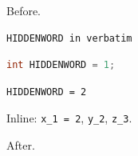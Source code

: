 \documentclass{article}
\begin{document}
Before.
\begin{verbatim}
HIDDENWORD in verbatim
\end{verbatim}
\begin{lstlisting}[language=C]
int HIDDENWORD = 1;
\end{lstlisting}
\begin{verbatim}
HIDDENWORD = 2
\end{verbatim}
Inline: \verb|x_1 = 2|, \lstinline{y_2}, \texttt{z\_3}.

After.
\end{document}
